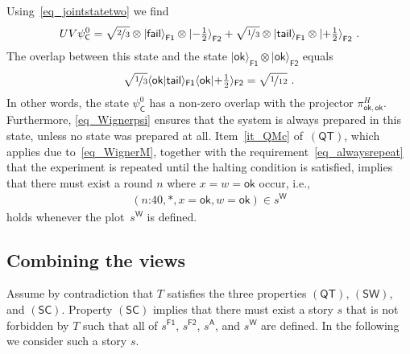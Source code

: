 \documentclass{article}
\theoremstyle{plain}
\theoremstyle{definition}
\newcommand*{\ket}[1]{{| #1 \rangle}}
\newcommand*{\spr}[2]{\langle #1 | #2 \rangle}
\newcommand*{\Friendone}{\mathsf{F1}}
\newcommand*{\Friendtwo}{\mathsf{F2}}
\newcommand*{\Assistant}{\mathsf{A}}
\newcommand*{\Wigner}{\mathsf{W}}
\newcommand*{\Coin}{\mathsf{C}}
\newcommand*{\sminus}{{\textstyle - \frac{1}{2}}}
\newcommand*{\splus}{{\textstyle + \frac{1}{2}}}
\newcommand*{\QT}{\mathsf{(QT)}}
\newcommand*{\SW}{\mathsf{(SW)}}
\newcommand*{\SelfCons}{\mathsf{(SC)}}
\newcommand*{\ok}{\mathsf{ok}}
\newcommand*{\fail}{\mathsf{fail}}
\newcommand*{\tail}{\mathsf{tail}}
\begin{document}
Using~\eqref{eq_jointstatetwo} we find
\begin{align} \label{eq_global}
    U V \psi^0_\Coin 
  = \sqrt{\nicefrac{2}{3}} \otimes \ket{\fail}_{\Friendone} \otimes \ket{\sminus}_{\Friendtwo} 
    + \sqrt{\nicefrac{1}{3}} \otimes \ket{\tail}_{\Friendone} \otimes \ket{\splus}_{\Friendtwo} \ .
\end{align}
The overlap between this state and the state $\ket{\ok}_{\Friendone}  \otimes  \ket{\ok}_{\Friendtwo}$ equals
\begin{align*}
  \sqrt{\nicefrac{1}{3}} \spr{\ok}{\tail}_{\Friendone} \spr{\ok}{\splus}_{\Friendtwo} = \sqrt{\nicefrac{1}{12}}  \ .
\end{align*}
In other words, the state $\psi^0_{\Coin}$ has a non-zero overlap with the projector $\pi^H_{\ok, \ok}$.  Furthermore, \eqref{eq_Wignerpsi} ensures that the system is always prepared in this state, unless no state was prepared at all. Item~\ref{it_QMc} of~$\QT$, which applies due to~\eqref{eq_WignerM}, together with the requirement~\eqref{eq_alwaysrepeat} that the experiment is repeated until the halting condition is satisfied, implies that there must exist a round $n$ where  $x = w = \ok$ occur, i.e., 
\begin{align} \label{eq_QTWigner}
   (\text{$n$:40}, *, x=\ok,  w=\ok) \in s^{\Wigner} 
\end{align}
holds whenever the plot~$s^{\Wigner}$ is defined.


\subsection{Combining the views}

Assume by contradiction that $T$ satisfies the three properties $\QT$, $\SW$, and $\SelfCons$. Property $\SelfCons$ implies that there must exist a story $s$ that is not forbidden by $T$ such that all of $s^{\Friendone}$, $s^{\Friendtwo}$, $s^{\Assistant}$, and $s^{\Wigner}$ are defined. In the following we consider such a story $s$. 
\end{document}
